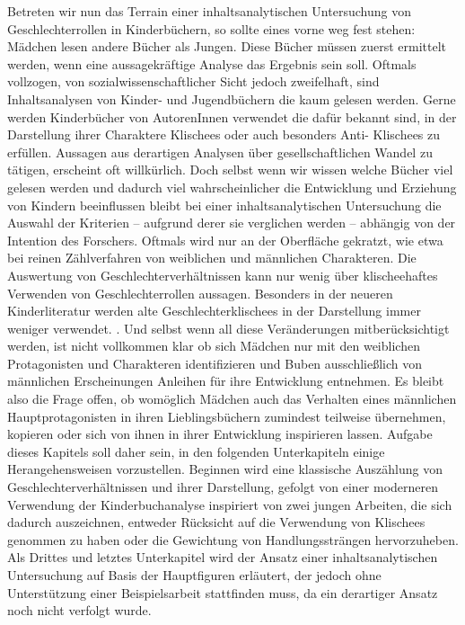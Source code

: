     Betreten wir nun das Terrain einer inhaltsanalytischen Untersuchung von
    Geschlechterrollen in Kinderbüchern, so sollte eines vorne weg fest stehen:
    Mädchen lesen andere Bücher als Jungen. Diese Bücher müssen zuerst ermittelt
    werden, wenn eine aussagekräftige Analyse das Ergebnis sein soll. Oftmals
    vollzogen, von sozialwissenschaftlicher Sicht jedoch zweifelhaft, sind
    Inhaltsanalysen von Kinder- und Jugendbüchern die kaum gelesen werden. Gerne
    werden Kinderbücher von AutorenInnen verwendet die dafür bekannt sind, in
    der Darstellung ihrer Charaktere Klischees oder auch besonders Anti-
    Klischees zu erfüllen. Aussagen aus derartigen Analysen über
    gesellschaftlichen Wandel zu tätigen, erscheint oft willkürlich. Doch selbst
    wenn wir wissen welche Bücher viel gelesen werden und dadurch viel
    wahrscheinlicher die Entwicklung und Erziehung von Kindern beeinflussen
    bleibt bei einer inhaltsanalytischen Untersuchung die Auswahl der Kriterien
    -- aufgrund derer sie verglichen werden -- abhängig von der Intention des
    Forschers. Oftmals wird nur an der Oberfläche gekratzt, wie etwa bei reinen
    Zählverfahren von weiblichen und männlichen Charakteren. Die Auswertung von
    Geschlechterverhältnissen kann nur wenig über klischeehaftes Verwenden von
    Geschlechterrollen aussagen. Besonders in der neueren Kinderliteratur werden
    alte Geschlechterklischees in der Darstellung immer weniger verwendet.
    . Und selbst wenn all diese Veränderungen mitberücksichtigt
    werden, ist nicht vollkommen klar ob sich Mädchen nur mit den weiblichen
    Protagonisten und Charakteren identifizieren und Buben ausschließlich von
    männlichen Erscheinungen Anleihen für ihre Entwicklung entnehmen. Es bleibt
    also die Frage offen, ob womöglich Mädchen auch das Verhalten eines
    männlichen Hauptprotagonisten in ihren Lieblingsbüchern zumindest teilweise
    übernehmen, kopieren oder sich von ihnen in ihrer Entwicklung inspirieren
    lassen. Aufgabe dieses Kapitels soll daher sein, in den folgenden
    Unterkapiteln einige Herangehensweisen vorzustellen. Beginnen wird eine
    klassische Auszählung von Geschlechterverhältnissen und ihrer Darstellung,
    gefolgt von einer moderneren Verwendung der Kinderbuchanalyse inspiriert von
    zwei jungen Arbeiten, die sich dadurch auszeichnen, entweder Rücksicht auf
    die Verwendung von Klischees genommen zu haben oder die Gewichtung von
    Handlungssträngen hervorzuheben. Als Drittes und letztes Unterkapitel wird
    der Ansatz einer inhaltsanalytischen Untersuchung auf Basis der Hauptfiguren
    erläutert, der jedoch ohne Unterstützung einer Beispielsarbeit stattfinden
    muss, da ein derartiger Ansatz noch nicht verfolgt wurde.

